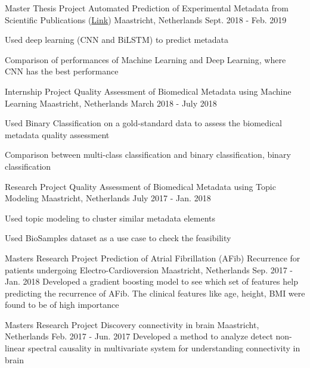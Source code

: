 \begin{cventries}
  \cventry
    {Master Thesis Project}
    {Automated Prediction of Experimental Metadata from Scientific Publications (\href{https://github.com/stutinayak/Thesis_metadata_wizard}{Link})}
    {Maastricht, Netherlands} 
    {Sept. 2018 - Feb. 2019}
    {
      \begin{cvitems}
        \item {Used deep learning (CNN and BiLSTM) to predict metadata}
        \item {Comparison of performances of Machine Learning and Deep Learning, where CNN has the best performance}
      \end{cvitems}
    }
  \cventry
    {Internship Project}
    {Quality Assessment of Biomedical Metadata using Machine Learning}
    {Maastricht, Netherlands}
    {March 2018 - July 2018}
    {
      \begin{cvitems}
        \item {Used Binary Classification on a gold-standard data to assess the biomedical metadata quality assessment}
        \item {Comparison between multi-class classification and binary classification, binary classification}
      \end{cvitems}
    }
  \cventry
    {Research Project}
    {Quality Assessment of Biomedical Metadata using Topic Modeling}
    {Maastricht, Netherlands}
    {July 2017 - Jan. 2018}
    {
      \begin{cvitems}
        \item {Used topic modeling to cluster similar metadata elements}
        \item {Used BioSamples dataset as a use case to check the feasibility}
      \end{cvitems}
    }
  \cventry
    {Masters Research Project}
    {Prediction of Atrial Fibrillation (AFib) Recurrence for patients undergoing Electro-Cardioversion}
    {Maastricht, Netherlands}
    {Sep. 2017 - Jan. 2018}
   {Developed a gradient boosting model to see which set of features help predicting the recurrence of AFib. The clinical features like age, height, BMI were found to be of high importance}
   
\cventry
    {Masters Research Project}
    {Discovery connectivity in brain}
    {Maastricht, Netherlands}
    {Feb. 2017 - Jun. 2017}
    {
         Developed a method to analyze detect non-linear spectral causality in multivariate system for understanding connectivity in brain 
    }
    

\end{cventries}
